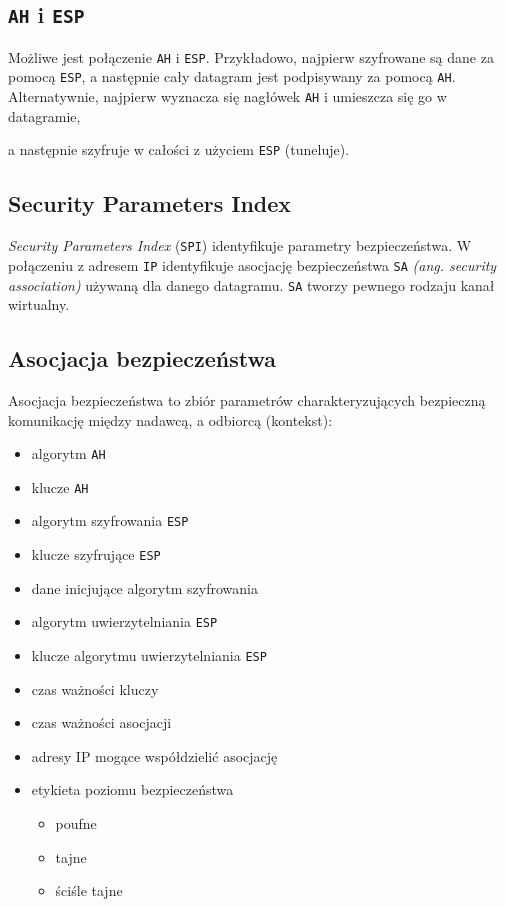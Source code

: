 \documentclass[a4paper]{article}
\begin{document}
\subsection{{\tt AH} i {\tt ESP}}

Możliwe jest połączenie {\tt AH} i {\tt ESP}. Przykładowo, najpierw szyfrowane są dane za pomocą {\tt ESP},
a następnie cały datagram jest podpisywany za pomocą {\tt AH}. Alternatywnie, najpierw wyznacza się nagłówek {\tt AH} i umieszcza się go w datagramie,

a następnie szyfruje w całości z użyciem {\tt ESP} (tuneluje).

\subsection{Security Parameters Index}

\emph{Security Parameters Index} ({\tt SPI}) identyfikuje parametry bezpieczeństwa.
W połączeniu z adresem {\tt IP} identyfikuje asocjację bezpieczeństwa {\tt SA} \emph{(ang. security association)} używaną dla danego datagramu.
{\tt SA} tworzy pewnego rodzaju kanał wirtualny.

\subsection{Asocjacja bezpieczeństwa}

Asocjacja bezpieczeństwa to zbiór parametrów charakteryzujących bezpieczną komunikację między nadawcą, a odbiorcą (kontekst):

\begin{itemize}
  \item algorytm {\tt AH}
  \item klucze {\tt AH}
  \item algorytm szyfrowania {\tt ESP}
  \item klucze szyfrujące {\tt ESP}
  \item dane inicjujące algorytm szyfrowania
  \item algorytm uwierzytelniania {\tt ESP}
  \item klucze algorytmu uwierzytelniania {\tt ESP}
  \item czas ważności kluczy
  \item czas ważności asocjacji
  \item adresy IP mogące współdzielić asocjację
  \item etykieta poziomu bezpieczeństwa
  \begin{itemize}
    \item poufne
    \item tajne
    \item ściśle tajne
  \end{itemize}
\end{itemize}
\end{document}
